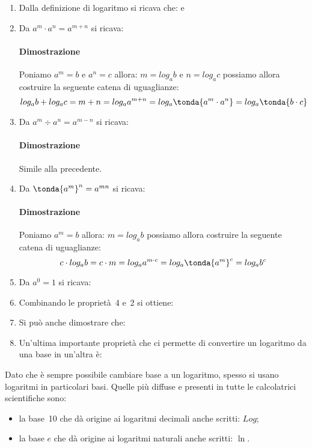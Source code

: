 \begin{enumerate} 
 \item Dalla definizione di logaritmo si ricava che:
 e 
 \item Da \quad \(a^m \cdot a^n = a^{m+n}\) \quad si ricava: \quad
\paragraph{Dimostrazione} 
Poniamo \(a^m = b\) e \(a^n = c\) 
allora: \(m = log_a {b}\) e \(n = log_a {c}\) possiamo allora costruire la 
seguente catena di uguaglianze:
\[log_a {b} + log_a {c} =
m + n =  
log_a {a^{m + n}} =
log_a \tonda{{a^m \cdot a^n}}  =
log_a \tonda{{b \cdot c}}\]
 \item Da \quad \(a^m \div a^n = a^{m-n}\) \quad si ricava: \quad
\paragraph{Dimostrazione} Simile alla precedente.\\[4pt]
 \item Da \quad \(\tonda{a^m}^n = a^{mn}\) \quad si ricava: \quad
\paragraph{Dimostrazione} 
Poniamo \(a^m = b\)  
allora: \(m = log_a {b}\) possiamo allora costruire la 
seguente catena di uguaglianze:
\[c \cdot log_a {b} =
c \cdot m = 
log_a {a^{m \cdot c}} =
log_a {\tonda{a^{m}}^c} = 
log_a {b^c}\]
 \item Da \quad \(a^0 = 1\) \quad si ricava: \quad
 \item Combinando le proprietà~4 e~2 si ottiene: \quad
 \item Si può anche dimostrare che: \quad
 \item Un'ultima importante proprietà che ci permette di convertire un 
logaritmo da una base in un'altra è: \quad
\end{enumerate}

\noindent
Dato che è sempre possibile cambiare base a un logaritmo, spesso si 
usano logaritmi in particolari basi. Quelle più diffuse e presenti in tutte 
le 
calcolatrici scientifiche sono: 
\begin{itemize}
 \item 
la base~10 che dà origine ai logaritmi decimali anche scritti: \(Log\);
 \item 
la base \(e\) che dà origine ai logaritmi naturali anche scritti: \(\ln\).
\end{itemize}

